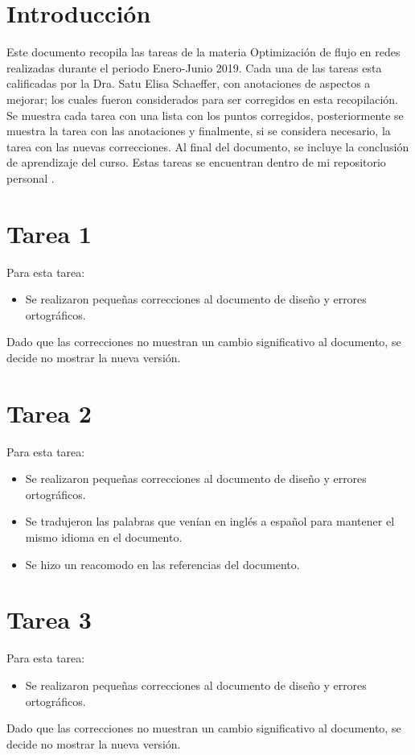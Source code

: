 \documentclass[12pt]{article}
\begin{document}
\pagebreak
\section{Introducción}
Este documento recopila las tareas de la materia Optimización de flujo en redes realizadas durante el periodo Enero-Junio 2019. Cada una de las tareas esta calificadas por la Dra. Satu Elisa Schaeffer, con anotaciones de aspectos a mejorar; los cuales fueron considerados para ser corregidos en esta recopilación.
Se muestra cada tarea con una lista con los puntos corregidos, posteriormente se muestra la tarea con las anotaciones y finalmente, si se considera necesario, la tarea con las nuevas correcciones.
Al final del documento, se incluye la conclusión de aprendizaje del curso.
Estas tareas se encuentran dentro de mi repositorio personal \cite{JAPC}.
\pagebreak
\section{Tarea 1}
Para esta tarea:
\begin{itemize}
    \item Se realizaron pequeñas correcciones al documento de diseño y errores ortográficos.
\end{itemize}
Dado que las correcciones no muestran un cambio significativo al documento, se decide no mostrar la nueva versión.


\section{Tarea 2}
Para esta tarea:
\begin{itemize}
    \item Se realizaron pequeñas correcciones al documento de diseño y errores ortográficos.
    \item Se tradujeron las palabras que venían en inglés a español para mantener el mismo idioma en el documento.
    \item Se hizo un reacomodo en las referencias del documento.
\end{itemize}



\section{Tarea 3}
Para esta tarea:
\begin{itemize}
    \item Se realizaron pequeñas correcciones al documento de diseño y errores ortográficos.
\end{itemize}
Dado que las correcciones no muestran un cambio significativo al documento, se decide no mostrar la nueva versión.

\end{document}
